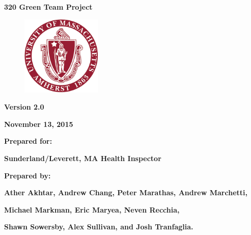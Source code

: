 \documentclass[twoside,letterpaper]{article}
\begin{document}
\clearpage\setcounter{page}{1}\pagestyle{Standard}
\thispagestyle{FirstPage}


\bigskip

{\centering{}\bfseries\color{black}
320 Green Team Project
\par}


\bigskip


\begin{figure}
\centering
\includegraphics[width=1.5in,height=1.5in]{Uma_seal.png}
\end{figure}

\bigskip


\bigskip

{\centering{}\bfseries\color{black}
Version 2.0
\par}

{\centering{}\bfseries\color{black}
November 13, 2015
\par}


\bigskip


\bigskip

{\centering{}\bfseries\color{black}
Prepared for:
\par}

{\centering{}\bfseries\color{black}
Sunderland/Leverett, MA Health Inspector
\par}


\bigskip


\bigskip

{\centering{}\bfseries\color{black}
Prepared by:
\par}

{\centering{}\bfseries\color{black}
Ather Akhtar, Andrew Chang, Peter Marathas, Andrew Marchetti, \par} 
{\centering{}\bfseries\color{black}
 Michael Markman, Eric Maryea, Neven Recchia,
\par}
{\centering{}\bfseries\color{black}
Shawn Sowersby, Alex Sullivan, and Josh Tranfaglia.\par}
\end{document}
